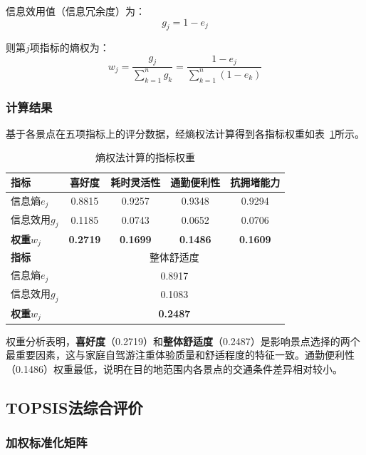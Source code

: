 \documentclass[12pt,a4paper]{ctexart}
\begin{document}
信息效用值（信息冗余度）为：
\begin{equation}
g_j = 1 - e_j
\end{equation}

则第$j$项指标的熵权为：
\begin{equation}
\label{eq:weight}
w_j = \frac{g_j}{\sum_{k=1}^{n} g_k} = \frac{1 - e_j}{\sum_{k=1}^{n}(1 - e_k)}
\end{equation}

\subsubsection{计算结果}

基于各景点在五项指标上的评分数据，经熵权法计算得到各指标权重如表~\ref{tab:weights}所示。

\begin{table}[H]
\centering
\caption{熵权法计算的指标权重}
\label{tab:weights}
\begin{tabular}{lcccc}
\toprule
\textbf{指标} & 喜好度 & 耗时灵活性 & 通勤便利性 & 抗拥堵能力 \\
\midrule
信息熵$e_j$ & 0.8815 & 0.9257 & 0.9348 & 0.9294 \\
信息效用$g_j$ & 0.1185 & 0.0743 & 0.0652 & 0.0706 \\
\textbf{权重$w_j$} & \textbf{0.2719} & \textbf{0.1699} & \textbf{0.1486} & \textbf{0.1609} \\
\midrule
\textbf{指标} & \multicolumn{4}{c}{整体舒适度} \\
\midrule
信息熵$e_j$ & \multicolumn{4}{c}{0.8917} \\
信息效用$g_j$ & \multicolumn{4}{c}{0.1083} \\
\textbf{权重$w_j$} & \multicolumn{4}{c}{\textbf{0.2487}} \\
\bottomrule
\end{tabular}
\end{table}

权重分析表明，\textbf{喜好度}（0.2719）和\textbf{整体舒适度}（0.2487）是影响景点选择的两个最重要因素，这与家庭自驾游注重体验质量和舒适程度的特征一致。通勤便利性（0.1486）权重最低，说明在目的地范围内各景点的交通条件差异相对较小。

\subsection{TOPSIS法综合评价}

\subsubsection{加权标准化矩阵}
\end{document}
